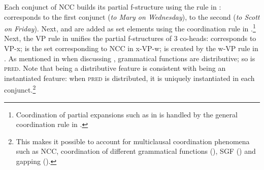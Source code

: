 \documentclass[output=paper]{../langscibook}
\begin{document}
Each conjunct of NCC builds its partial f-structure using the rule in :  corresponds to the first conjunct (\emph{to Mary on Wednesday}),  to the second (\emph{to Scott on Friday}).
Next,  and
 are added as set elements using the
coordination rule in .\footnote{Coordination of partial expansions such as in
   is handled by the general
coordination rule in .}
Next, the VP rule in  unifies the
partial f-structures of 3 co-heads:
 corresponds to VP-x;
 is the set corresponding to
NCC in x-VP-w;
 is created by the w-VP
rule in . As mentioned in  when discussing
, grammatical functions are distributive; so
is \textsc{pred}.
%
Note that being a distributive feature is consistent
with being an instantiated feature: when \textsc{pred} is distributed,
it is uniquely instantiated in each conjunct.\footnote{This makes it
  possible to account for multiclausal coordination phenomena such as
  NCC, coordination of different grammatical functions
  (), SGF () and gapping
  ().}
\end{document}
